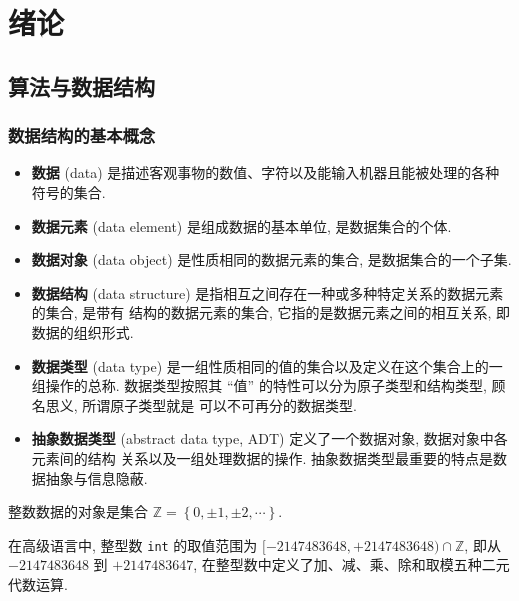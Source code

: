 \documentclass[10pt,UTF8]{book} %
\begin{document}
\makeatletter
\let\ps@plain\ps@empty
\makeatother

\mainmatter

\chapter{绪论}

\section{算法与数据结构}

\subsection{数据结构的基本概念}

\begin{itemize}[itemsep=0pt]
    \item \textbf{数据} (data) 是描述客观事物的数值、字符以及能输入机器且能被处理的各种符号的集合.
    \item \textbf{数据元素} (data element) 是组成数据的基本单位, 是数据集合的个体.
    \item \textbf{数据对象} (data object) 是性质相同的数据元素的集合, 是数据集合的一个子集.
    \item \textbf{数据结构} (data structure) 是指相互之间存在一种或多种特定关系的数据元素的集合, 是带有
    结构的数据元素的集合, 它指的是数据元素之间的相互关系, 即数据的组织形式.
    \item \textbf{数据类型} (data type) 是一组性质相同的值的集合以及定义在这个集合上的一组操作的总称.
    数据类型按照其 “值” 的特性可以分为原子类型和结构类型, 顾名思义, 所谓原子类型就是
    可以不可再分的数据类型.
    \item \textbf{抽象数据类型} (abstract data type, ADT) 定义了一个数据对象, 数据对象中各元素间的结构
    关系以及一组处理数据的操作. 抽象数据类型最重要的特点是数据抽象与信息隐蔽.
\end{itemize}

\begin{example}
    整数数据的对象是集合 $\mathbb{Z} = \left\{ 0, \pm1, \pm2, \cdots \right\}$.
\end{example}

\begin{example}
    在高级语言中, 整型数 \lstinline|int| 的取值范围为 
    $[-2147483648, +2147483648) \cap \mathbb{Z}$, 即从 $-2147483648$ 到
    $+2147483647$, 在整型数中定义了加、减、乘、除和取模五种二元代数运算.
\end{example}
\end{document}
